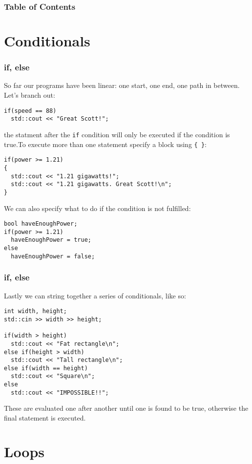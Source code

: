 \documentclass{beamer}
\subtitle{Session 2: Control structure}
\begin{document}
\frame{\titlepage}

\begin{frame}
\frametitle{Table of Contents}
\tableofcontents
\end{frame}

\section{Conditionals}

\begin{frame}[fragile]
	\frametitle{if, else}
	So far our programs have been linear: one start, one end, one path in between.  Let's branch out:
	\begin{lstlisting}
if(speed == 88)
  std::cout << "Great Scott!";
	\end{lstlisting}
	the statment after the \texttt{if} condition will only be executed if the condition is true.\pause  To execute more than one statement specify a block using \texttt{\{ \}}:
	\begin{lstlisting}
if(power >= 1.21)
{
  std::cout << "1.21 gigawatts!";
  std::cout << "1.21 gigawatts. Great Scott!\n";
}
	\end{lstlisting} 
	\pause
	We can also specify what to do if the condition is not fulfilled:
	\begin{lstlisting}
bool haveEnoughPower;
if(power >= 1.21)
  haveEnoughPower = true;
else
  haveEnoughPower = false;	
	\end{lstlisting}
\end{frame}



\begin{frame}[fragile]
  \frametitle{if, else}
  Lastly we can string together a series of conditionals, like so:
	\begin{lstlisting}
int width, height;
std::cin >> width >> height;
	
if(width > height)
  std::cout << "Fat rectangle\n";
else if(height > width)
  std::cout << "Tall rectangle\n";
else if(width == height)
  std::cout << "Square\n";
else
  std::cout << "IMPOSSIBLE!!";
	\end{lstlisting}
	These are evaluated one after another until one is found to be true, otherwise the final  statement is executed.
	\pause
\end{frame}

\section{Loops}
\end{document}

